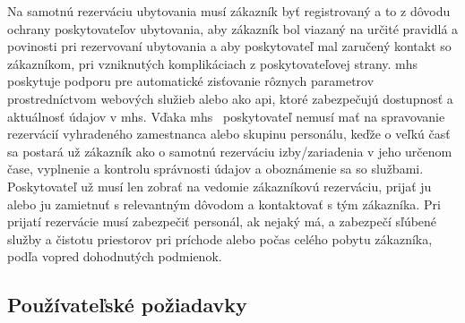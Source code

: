 Na samotnú rezerváciu ubytovania musí zákazník byť registrovaný a to z 
dôvodu ochrany poskytovateľov ubytovania, aby zákazník bol viazaný na 
určité pravidlá a povinosti pri rezervovaní ubytovania a aby poskytovateľ 
mal zaručený kontakt so zákazníkom, pri vzniknutých komplikáciach z 
poskytovateľovej strany. \acrshort{mhs} poskytuje podporu pre automatické 
zisťovanie rôznych parametrov prostredníctvom webových služieb alebo ako 
\acrfull{api}, ktoré zabezpečujú dostupnosť a aktuálnosť údajov v 
\acrshort{mhs}. Vďaka \acrshort{mhs} \projectName\ poskytovateľ nemusí mať 
na spravovanie rezervácií vyhradeného zamestnanca alebo skupinu personálu, 
keďže o veľkú časť sa postará už zákazník ako o samotnú rezerváciu 
izby/zariadenia v jeho určenom čase, vyplnenie a kontrolu správnosti údajov 
a oboznámenie sa so službami. Poskytovateľ už musí len zobrať na vedomie 
zákazníkovú rezerváciu, prijať ju alebo ju zamietnuť s relevantným dôvodom 
a kontaktovať s tým zákazníka. Pri prijatí rezervácie musí zabezpečiť 
personál, ak nejaký má, a zabezpečí sľúbené služby a čistotu priestorov 
pri príchode alebo počas celého pobytu zákazníka, podľa vopred dohodnutých 
podmienok.

\newpage

\subsection{Používateľské požiadavky}

